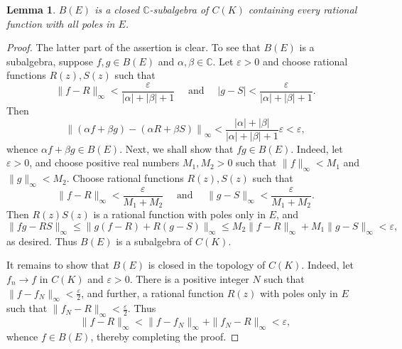 \documentclass[11pt]{article}
\theoremstyle{thmstyle}
\newtheorem{lemma}[theorem]{Lemma}
\theoremstyle{defstyle}
\newcommand{\bbC}{\mathbb{C}}
\renewcommand{\le}{\leqslant}
\begin{document}
\begin{lemma}
    $B(E)$ is a closed $\bbC$-subalgebra of $C(K)$ containing every rational function with all poles in $E$.
\end{lemma}
\begin{proof}
    The latter part of the assertion is clear. To see that $B(E)$ is a subalgebra, suppose $f, g\in B(E)$ and $\alpha,\beta\in\bbC$. Let $\varepsilon > 0$ and choose rational functions $R(z), S(z)$ such that 
    \begin{equation*}
        \|f - R\|_\infty < \frac{\varepsilon}{|\alpha| + |\beta| + 1}\quad\text{ and }\quad |g - S| < \frac{\varepsilon}{|\alpha| + |\beta| + 1}.
    \end{equation*}
    Then 
    \begin{equation*}
        \left\|(\alpha f + \beta g) - (\alpha R + \beta S)\right\|_\infty < \frac{|\alpha| + |\beta|}{|\alpha| + |\beta| + 1}\varepsilon < \varepsilon,
    \end{equation*}
    whence $\alpha f + \beta g\in B(E)$. Next, we shall show that $fg\in B(E)$. Indeed, let $\varepsilon > 0$, and choose positive real numbers $M_1, M_2 > 0$ such that $\|f\|_\infty < M_1$ and $\|g\|_\infty < M_2$. Choose rational functions $R(z), S(z)$ such that 
    \begin{equation*}
        \|f - R\|_\infty < \frac{\varepsilon}{M_1 + M_2}\quad\text{ and }\quad\|g - S\|_\infty < \frac{\varepsilon}{M_1 + M_2}.
    \end{equation*}
    Then $R(z)S(z)$ is a rational function with poles only in $E$, and 
    \begin{equation*}
        \|fg - RS\|_\infty\le \|g(f - R) + R(g - S)\|_\infty\le M_2\|f - R\|_\infty + M_1\|g - S\|_\infty < \varepsilon,
    \end{equation*}
    as desired. Thus $B(E)$ is a subalgebra of $C(K)$. 

    It remains to show that $B(E)$ is closed in the topology of $C(K)$. Indeed, let $f_n\to f$ in $C(K)$ and $\varepsilon > 0$. There is a positive integer $N$ such that $\|f - f_N\|_\infty < \frac{\varepsilon}{2}$, and further, a rational function $R(z)$ with poles only in $E$ such that $\|f_N - R\|_\infty < \frac{\varepsilon}{2}$. Thus 
    \begin{equation*}
        \|f - R\|_\infty < \|f - f_N\|_\infty + \|f_N - R\|_\infty < \varepsilon,
    \end{equation*}
    whence $f\in B(E)$, thereby completing the proof.
\end{proof}
\end{document}
